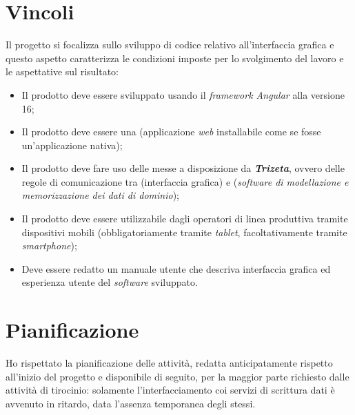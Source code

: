 \section{Vincoli}

Il progetto si focalizza sullo sviluppo di codice relativo all'interfaccia grafica e questo aspetto caratterizza le condizioni imposte per lo svolgimento del lavoro e le aspettative sul risultato:
\begin{itemize}
    \item Il prodotto deve essere sviluppato usando il \textit{framework Angular} alla versione 16;
    \item Il prodotto deve essere una  (applicazione \textit{web} installabile come se fosse un'applicazione nativa);
    \item Il prodotto deve fare uso delle  messe a disposizione da \textit{\textbf{Trizeta}}, ovvero delle regole di comunicazione tra  (interfaccia grafica) e  (\textit{software di modellazione e memorizzazione dei dati di dominio});
    \item Il prodotto deve essere utilizzabile dagli operatori di linea produttiva tramite dispositivi mobili (obbligatoriamente tramite \textit{tablet}, facoltativamente tramite \textit{smartphone});
    \item Deve essere redatto un manuale utente che  descriva interfaccia grafica ed esperienza utente del \textit{software} sviluppato.
\end{itemize}

\section{Pianificazione}
\label{sec:pianificazione}
Ho rispettato la pianificazione delle attività, redatta anticipatamente rispetto all'inizio del progetto e disponibile di seguito, per la maggior parte  richiesto dalle attività di tirocinio: solamente l'interfacciamento coi servizi
di scrittura dati è avvenuto in ritardo, data l'assenza temporanea degli stessi.

